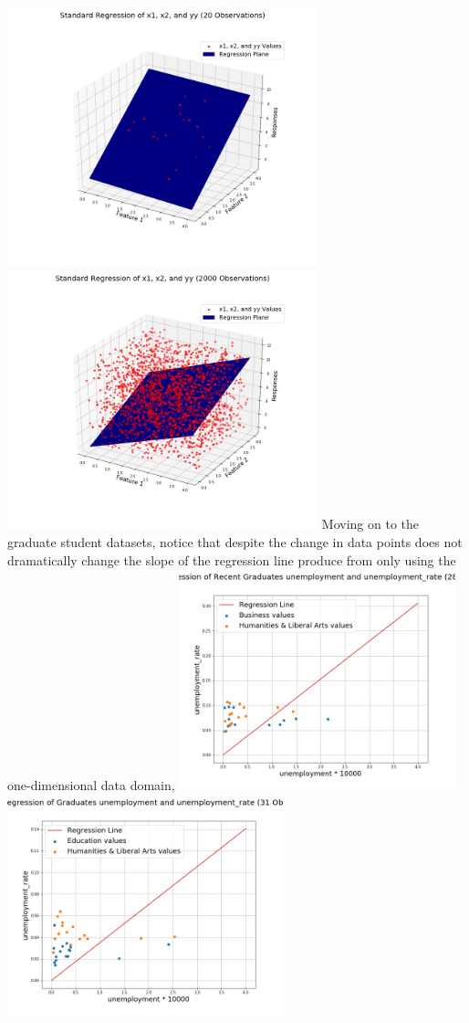 \documentclass[a4paper,12pt]{IEEEtran}
\begin{document}
\includegraphics[width=9cm]{std_reg_2d_20_obsv} \includegraphics[width=9cm]{std_reg_2d_2000_obsv}
Moving on to the graduate student datasets, notice that despite the change in data points does not dramatically change the slope of the regression line produce from only using the one-dimensional data domain,
\includegraphics[width=8cm]{std_reg_1d_recent_grad} \includegraphics[width=8cm]{std_reg_1d_grad}
\end{document}
